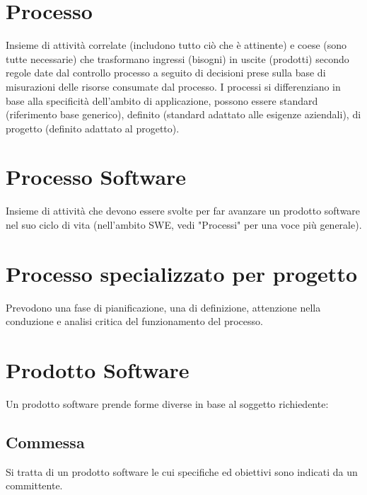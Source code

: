 \documentclass[11pt]{article}
\begin{document}
	\section{\LARGE Processo}	
	\label{sec:processi}
	Insieme di attività correlate (includono tutto ciò che è attinente) e coese (sono tutte necessarie) che trasformano ingressi (bisogni) in uscite (prodotti) secondo regole date dal controllo processo a seguito di decisioni prese sulla base di misurazioni delle risorse consumate dal processo.
	I processi si differenziano in base alla specificità dell'ambito di applicazione, possono essere standard (riferimento base generico), definito (standard adattato alle esigenze aziendali), di progetto (definito adattato al progetto).
	
	\section{\LARGE Processo Software}
	\label{sec:processisoftware}
Insieme di attività che devono essere svolte per far avanzare un prodotto software nel suo ciclo di vita (nell'ambito SWE, vedi "Processi" per una voce più generale).

	\section{\LARGE Processo specializzato per progetto}
	\label{sec:processispecializzati}
	Prevodono una fase di pianificazione, una di definizione, attenzione nella conduzione e analisi critica del funzionamento del processo.
	
	\section{\LARGE Prodotto Software}
	\label{sec:prodottosoftware}
	Un prodotto software prende forme diverse in base al soggetto richiedente:
		
		\subsection{Commessa}
		Si tratta di un prodotto software le cui specifiche ed obiettivi sono indicati da un committente.
	
\end{document}
